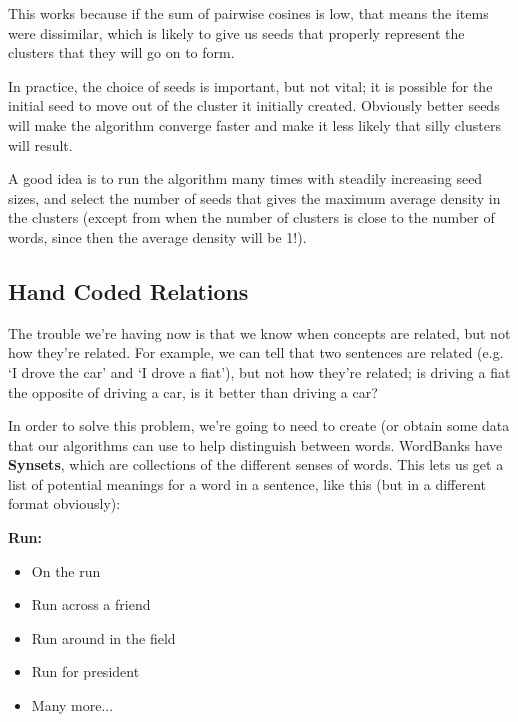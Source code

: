 This works because if the sum of pairwise cosines is low, that means the items
were dissimilar, which is likely to give us seeds that properly represent the
clusters that they will go on to form.

In practice, the choice of seeds is important, but not vital; it is possible for
the initial seed to move out of the cluster it initially created. Obviously
better seeds will make the algorithm converge faster and make it less likely
that silly clusters will result.

A good idea is to run the algorithm many times with steadily increasing seed
sizes, and select the number of seeds that gives the maximum average density in
the clusters (except from when the number of clusters is close to the number of
words, since then the average density will be 1!).

\subsection{Hand Coded Relations}

The trouble we're having now is that we know when concepts are related, but not
how they're related. For example, we can tell that two sentences are related
(e.g. `I drove the car' and `I drove a fiat'), but not how they're related; is
driving a fiat the opposite of driving a car, is it better than driving a car?

In order to solve this problem, we're going to need to create (or obtain some
data that our algorithms can use to help distinguish between words. WordBanks
have \textbf{Synsets}, which are collections of the different senses of words.
This lets us get a list of potential meanings for a word in a sentence, like
this (but in a different format obviously):

\begin{description}
  \item \textbf{Run:}
  \begin{mymulticols}
    \begin{itemize}
      \item On the run
      \item Run across a friend
      \item Run around in the field
      \item Run for president
      \item Many more...
    \end{itemize}
  \end{mymulticols}
\end{description}

